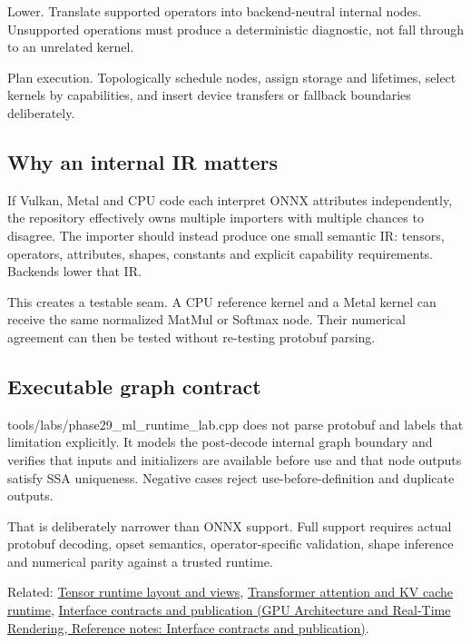 Lower. Translate supported operators into backend-neutral internal nodes. Unsupported operations must produce a deterministic diagnostic, not fall through to an unrelated kernel.

Plan execution. Topologically schedule nodes, assign storage and lifetimes, select kernels by capabilities, and insert device transfers or fallback boundaries deliberately.

\subsection{Why an internal IR matters}\label{appendix-a87217e3af2b-why-an-internal-ir-matters}

\hypertarget{appendix-a87217e3af2b-why-an-internal-ir-matters}{}

If Vulkan, Metal and CPU code each interpret ONNX attributes independently, the repository effectively owns multiple importers with multiple chances to disagree. The importer should instead produce one small semantic IR: tensors, operators, attributes, shapes, constants and explicit capability requirements. Backends lower that IR.

This creates a testable seam. A CPU reference kernel and a Metal kernel can receive the same normalized MatMul or Softmax node. Their numerical agreement can then be tested without re-testing protobuf parsing.

\subsection{Executable graph contract}\label{appendix-a87217e3af2b-executable-graph-contract}

\hypertarget{appendix-a87217e3af2b-executable-graph-contract}{}

tools/labs/phase29\_ml\_runtime\_lab.cpp does not parse protobuf and labels that limitation explicitly. It models the post-decode internal graph boundary and verifies that inputs and initializers are available before use and that node outputs satisfy SSA uniqueness. Negative cases reject use-before-definition and duplicate outputs.

That is deliberately narrower than ONNX support. Full support requires actual protobuf decoding, opset semantics, operator-specific validation, shape inference and numerical parity against a trusted runtime.

Related: \hyperref[appendix-cebadf3106d1]{Tensor runtime layout and views}, \hyperref[appendix-ea2dadd21ce5]{Transformer attention and KV cache runtime}, \href{../06-GPU-Architecture-and-Real-Time-Rendering/main.pdf\#nameddest=appendix-fdae7ff0a23f}{Interface contracts and publication (GPU Architecture and Real-Time Rendering, Reference notes: Interface contracts and publication)}.

